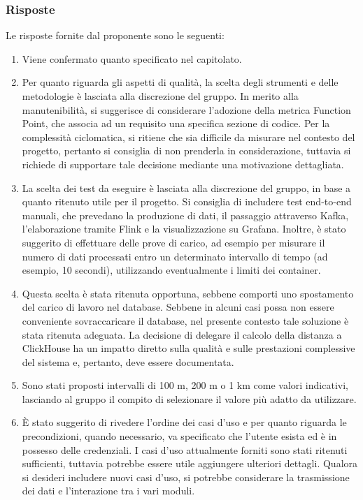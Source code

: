 \documentclass[10pt]{article}
\begin{document}
\subsubsection{Risposte}
Le risposte fornite dal proponente sono le seguenti:
\begin{enumerate}
    \item Viene confermato quanto specificato nel capitolato.
    \item Per quanto riguarda gli aspetti di qualità, la scelta degli strumenti e delle metodologie è lasciata alla discrezione del gruppo. In merito alla manutenibilità, si suggerisce di considerare l'adozione della metrica Function Point, che associa ad un requisito una specifica sezione di codice. Per la complessità ciclomatica, si ritiene che sia difficile da misurare nel contesto del progetto, pertanto si consiglia di non prenderla in considerazione, tuttavia si richiede di supportare tale decisione mediante una motivazione dettagliata.   
    \item La scelta dei test da eseguire è lasciata alla discrezione del gruppo, in base a quanto ritenuto utile per il progetto. Si consiglia di includere test end-to-end manuali, che prevedano la produzione di dati, il passaggio attraverso Kafka, l'elaborazione tramite Flink e la visualizzazione su Grafana. Inoltre, è stato suggerito di effettuare delle prove di carico, ad esempio per misurare il numero di dati processati entro un determinato intervallo di tempo (ad esempio, 10 secondi), utilizzando eventualmente i limiti dei container.
    \item Questa scelta è stata ritenuta opportuna, sebbene comporti uno spostamento del carico di lavoro nel database. Sebbene in alcuni casi possa non essere conveniente sovraccaricare il database, nel presente contesto tale soluzione è stata ritenuta adeguata. La decisione di delegare il calcolo della distanza a ClickHouse ha un impatto diretto sulla qualità e sulle prestazioni complessive del sistema  e, pertanto, deve essere documentata.
    \item Sono stati proposti intervalli di 100 m, 200 m o 1 km come valori indicativi, lasciando al gruppo il compito di selezionare il valore più adatto da utilizzare.
    \item È stato suggerito di rivedere l'ordine dei casi d'uso e per quanto riguarda le precondizioni, quando necessario, va specificato che l'utente esista ed è in possesso delle credenziali. I casi d'uso attualmente forniti sono stati ritenuti sufficienti, tuttavia potrebbe essere utile aggiungere ulteriori dettagli. Qualora si desideri includere nuovi casi d'uso, si potrebbe considerare la trasmissione dei dati e l'interazione tra i vari moduli.
\end{enumerate}
\end{document}

